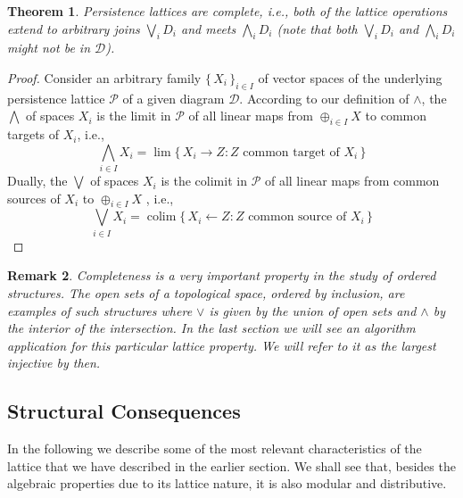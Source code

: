 \documentclass[10pt]{amsart}
\newtheorem{theorem}{Theorem}[section]
\newtheorem{remark}[theorem]{Remark}
\def \DD{{\mathcal D}}
\def \Pe{{\mathcal P}}
\DeclareMathOperator*{\colim}{colim}
\newcommand{\set}[1]{\{\,#1\,\}}
\newcommand{\from}{\leftarrow}
\newcommand{\meet}{\wedge}
\newcommand{\bigmeet}{\bigwedge}
\newcommand{\bigjoin}{\bigvee}
\begin{document}


\begin{theorem}\label{complete}
Persistence lattices are complete, i.e., both of the lattice operations extend to arbitrary
joins $\bigjoin_i D_i$ and meets $\bigmeet_i D_i$ (note that both
$\bigjoin_i D_i$ and $\bigmeet_i D_i$ might not be in $\DD$).
\end{theorem}

\begin{proof}
Consider an arbitrary family $\set{X_i}_{i\in I}$ of vector spaces of the underlying persistence lattice $\Pe$ of a given diagram $\DD$. 
According to our definition of $\meet$, the $\bigmeet$ of spaces $X_i$ is the limit in $\Pe$ of all linear maps from $\oplus_{i\in I} X$ to common targets of $X_i$, i.e., 
    \[
  \bigmeet_{i\in I} X_i = \lim\set{X_i\to Z :  Z \text{ common target of $X_i$}}
  \]
Dually, the $\bigjoin$ of spaces $X_i$ is the colimit in $\Pe$ of all linear maps from common sources of $X_i$ to $\oplus_{i\in I} X$ , i.e., 
    \[
  \bigjoin_{i\in I} X_i = \colim\set{X_i\from Z :  Z \text{ common source of $X_i$}}
  \] 
%
\end{proof}

\begin{remark}
Completeness is a very important property in the study of ordered structures.
The open sets of a topological space, ordered by inclusion, are examples of such structures where $\vee$ is given by the union of open sets and $\wedge$ by the interior of the intersection. 
In the last section we will see an algorithm application for this particular lattice property. 
We will refer to it as \emph{the largest injective} by then.  
\end{remark}


 
 
 
 
 
 

\subsection{Structural Consequences}

In the following we describe some of the most relevant characteristics of the lattice that we have described in the earlier section.
We shall see that, besides the algebraic properties due to its lattice nature, it is also modular and distributive. 
%
%
\end{document}

